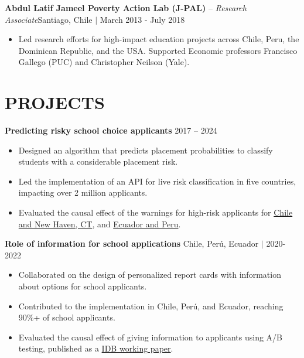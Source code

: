 \documentclass[letter,9pt]{extarticle}
\begin{document}
\noindent
\textbf{Abdul Latif Jameel Poverty Action Lab (J-PAL)} -- \textit{Research Associate}\hfill Santiago, Chile $|$ March 2013 - July 2018 %
\begin{itemize}
    \item Led research efforts for high-impact education projects across Chile, Peru, the Dominican Republic, and the USA. Supported Economic professors Francisco Gallego (PUC) and Christopher Neilson (Yale).
\end{itemize}



\section*{PROJECTS}

\noindent
\textbf{Predicting risky school choice applicants} \hfill   2017 – 2024 
\begin{itemize}
    \item Designed an algorithm that predicts placement probabilities to classify students with a considerable placement risk.
    \item Led the implementation of an API for live risk classification in five countries, impacting over 2 million applicants.
    \item Evaluated the causal effect of the warnings for high-risk applicants for \href{https://academic.oup.com/qje/article/137/3/1791/6544686?login=false}{Chile and New Haven, CT}, and  \href{https://publications.iadb.org/en/can-information-school-attributes-and-placement-probabilities-direct-search-and-choice-evidence}{Ecuador and Peru}.
\end{itemize}
\noindent
\textbf{Role of information for school applications} \hfill Chile, Perú, Ecuador $|$ 2020-2022
\begin{itemize}
    \item Collaborated on the design of personalized report cards with information about options for school applicants.
    \item Contributed to the implementation in Chile, Perú, and Ecuador, reaching 90\%+ of school applicants.
    \item Evaluated the causal effect of giving information to applicants using A/B testing, published as a \href{https://publications.iadb.org/en/can-information-school-attributes-and-placement-probabilities-direct-search-and-choice-evidence}{IDB working paper}.
\end{itemize}
\end{document}
